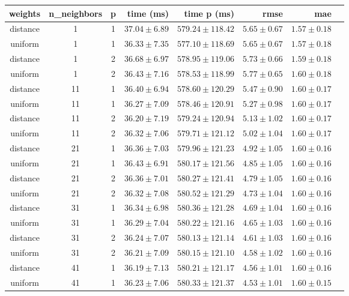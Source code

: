 \begin{tabular}{cccrrrrr}
\toprule
\textbf{weights} & \textbf{n\_neighbors} & \textbf{p} & \textbf{time (ms)} & \textbf{time p (ms)} & \textbf{rmse} & \textbf{mae}\\
\midrule
distance & 1 & 1 & $37.04 \pm 6.89$ & $579.24 \pm 118.42$ & $5.65 \pm 0.67$ & $1.57 \pm 0.18$\\
uniform & 1 & 1 & $36.33 \pm 7.35$ & $577.10 \pm 118.69$ & $5.65 \pm 0.67$ & $1.57 \pm 0.18$\\
distance & 1 & 2 & $36.68 \pm 6.97$ & $578.95 \pm 119.06$ & $5.73 \pm 0.66$ & $1.59 \pm 0.18$\\
uniform & 1 & 2 & $36.43 \pm 7.16$ & $578.53 \pm 118.99$ & $5.77 \pm 0.65$ & $1.60 \pm 0.18$\\
distance & 11 & 1 & $36.40 \pm 6.94$ & $578.60 \pm 120.29$ & $5.47 \pm 0.90$ & $1.60 \pm 0.17$\\
uniform & 11 & 1 & $36.27 \pm 7.09$ & $578.46 \pm 120.91$ & $5.27 \pm 0.98$ & $1.60 \pm 0.17$\\
distance & 11 & 2 & $36.20 \pm 7.19$ & $579.24 \pm 120.94$ & $5.13 \pm 1.02$ & $1.60 \pm 0.17$\\
uniform & 11 & 2 & $36.32 \pm 7.06$ & $579.71 \pm 121.12$ & $5.02 \pm 1.04$ & $1.60 \pm 0.17$\\
distance & 21 & 1 & $36.36 \pm 7.03$ & $579.96 \pm 121.23$ & $4.92 \pm 1.05$ & $1.60 \pm 0.16$\\
uniform & 21 & 1 & $36.43 \pm 6.91$ & $580.17 \pm 121.56$ & $4.85 \pm 1.05$ & $1.60 \pm 0.16$\\
distance & 21 & 2 & $36.36 \pm 7.01$ & $580.27 \pm 121.41$ & $4.79 \pm 1.05$ & $1.60 \pm 0.16$\\
uniform & 21 & 2 & $36.32 \pm 7.08$ & $580.52 \pm 121.29$ & $4.73 \pm 1.04$ & $1.60 \pm 0.16$\\
distance & 31 & 1 & $36.34 \pm 6.98$ & $580.36 \pm 121.28$ & $4.69 \pm 1.04$ & $1.60 \pm 0.16$\\
uniform & 31 & 1 & $36.29 \pm 7.04$ & $580.22 \pm 121.16$ & $4.65 \pm 1.03$ & $1.60 \pm 0.16$\\
distance & 31 & 2 & $36.24 \pm 7.07$ & $580.13 \pm 121.14$ & $4.61 \pm 1.03$ & $1.60 \pm 0.16$\\
uniform & 31 & 2 & $36.21 \pm 7.09$ & $580.15 \pm 121.10$ & $4.58 \pm 1.02$ & $1.60 \pm 0.16$\\
distance & 41 & 1 & $36.19 \pm 7.13$ & $580.21 \pm 121.17$ & $4.56 \pm 1.01$ & $1.60 \pm 0.16$\\
uniform & 41 & 1 & $36.23 \pm 7.06$ & $580.33 \pm 121.37$ & $4.53 \pm 1.01$ & $1.60 \pm 0.15$\\

\end{tabular}
